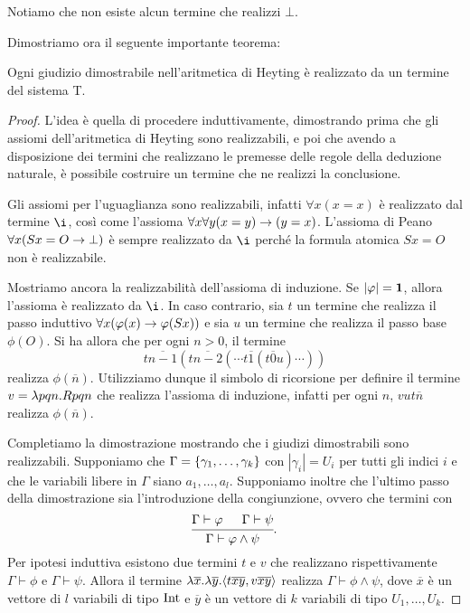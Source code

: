 \documentclass[]{marticle}
\begin{document}
Notiamo che non esiste alcun termine che realizzi $\bot$.

Dimostriamo ora il seguente importante teorema:
\begin{block}[Teorema]
    \label{realiz}
    Ogni giudizio dimostrabile nell'aritmetica di Heyting \`e realizzato da un
    termine del sistema T.
\end{block}
\begin{proof}
    L'idea \`e quella di procedere induttivamente, dimostrando prima che gli
    assiomi dell'aritmetica di Heyting sono realizzabili, e poi che avendo a
    disposizione dei termini che realizzano le premesse delle regole della
    deduzione naturale, \`e possibile costruire un termine che ne realizzi la
    conclusione.

    Gli assiomi per l'uguaglianza sono realizzabili, infatti $\forall x(x=x)$
    \`e realizzato dal termine $\i$, cos\`i come l'assioma $\forall x\forall y
    (x=y)\rightarrow(y=x)$. 
    L'assioma di Peano $\forall x (Sx=O\rightarrow \bot)$ \`e sempre realizzato da $\i$
    perch\'e la formula atomica $Sx=O$ non \`e realizzabile.

    Mostriamo ancora la realizzabilit\`a dell'assioma di induzione. Se
    $|\varphi|=\text{\textbf{1}}$, allora l'assioma \`e realizzato da $\i$. In caso contrario,
    sia $t$ un termine che realizza il passo induttivo $\forall x(\varphi(x) \rightarrow
    \varphi(Sx))$ e sia $u$ un termine che realizza il passo base $\phi(O)$. Si ha
    allora che per ogni $n>0$, il termine
    \[
        t\overline{n-1}(t \overline{n-2}(\cdots t \overline{1}( t \overline{0} u
        )\cdots))
    \]
    realizza $\phi(\overline{n})$. Utilizziamo dunque il simbolo di ricorsione
    per definire il termine $v = \lambda pqn. Rpqn$ che realizza l'assioma di
    induzione, infatti per ogni $n$, $vut\overline{n}$ realizza
    $\phi(\overline{n})$.

    Completiamo la dimostrazione mostrando che i giudizi dimostrabili sono
    realizzabili. Supponiamo che $\Gamma = \{\gamma_1, \dots , \gamma_k\}$
    con $|\gamma_i| = U_i$ per tutti gli indici $i$ e che le variabili libere in
    $\Gamma$ siano $a_1, \dots, a_l$. Supponiamo inoltre che l'ultimo passo
    della dimostrazione sia l'introduzione della congiunzione, ovvero che
    termini con
    \[
        \begin{prooftree}
            \hypo{\Gamma\vdash \phi}
            \hypo{\Gamma\vdash \psi}
            \infer2{\Gamma\vdash \phi\land\psi}
        \end{prooftree}.
    \]
    Per ipotesi induttiva esistono due termini $t$ e $v$ che realizzano
    rispettivamente $\Gamma \vdash\phi$ e $\Gamma \vdash\psi$. Allora il termine
    $\lambda \overline{x}. \lambda \overline{y}. \langle t\overline{x} \overline{y},v
    \overline{x} \overline{y} \rangle$ realizza $\Gamma \vdash \phi \land \psi$, dove
    $\overline{x}$ \`e un vettore di $l$ variabili di tipo $\text{Int}$ e
    $\overline{y}$ \`e un vettore di $k$ variabili di tipo $U_1, \dots, U_k$.


\end{proof}
\end{document}
